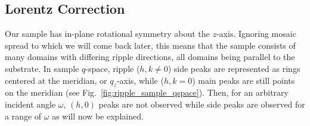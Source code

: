 \subsection{Lorentz Correction}\label{sec:Lorentz_correction}
Our sample has in-plane rotational symmetry about the $z$-axis. 
Ignoring mosaic spread to which we will come back later, this means that the sample 
consists of many domains with differing ripple directions, all domains
being parallel to the substrate.  
In sample $q$-space, ripple ($h, k\neq 0$) side peaks are represented as rings 
centered at the meridian, or $q_z$-axis, 
while ($h, k=0$) main peaks are still points on the meridian 
(see Fig.~\ref{fig:ripple_sample_qspace}). 
Then, for an arbitrary incident angle $\omega$, $(h, 0)$ peaks are not observed
while side peaks are observed for a range of $\omega$ as will now be explained. 

